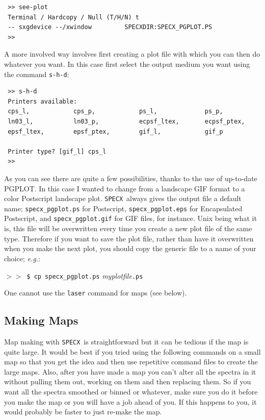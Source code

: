\documentclass[11pt,twoside]{article}
\newcommand{\eg}{{\it e.g.}}
\newcommand{\SPECX}{{\tt SPECX}}
\newcommand{\SP}{{$>\!>$}}
\begin{document}
\begin{verbatim}
 >> see-plot
 Terminal / Hardcopy / Null (T/H/N) t
 -- sxgdevice --/xwindow         SPECXDIR:SPECX_PGPLOT.PS
 >> 
\end{verbatim}

A more involved way involves first creating a plot file with which you
can then do whatever you want. In this case first select the output
medium you want using the command {\tt s-h-d}:

\begin{verbatim}
 >> s-h-d
 Printers available: 
 cps_l,            cps_p,            ps_l,             ps_p,             
 ln03_l,           ln03_p,           ecpsf_ltex,       ecpsf_ptex,       
 epsf_ltex,        epsf_ptex,        gif_l,            gif_p             
 
 Printer type? [gif_l] cps_l
 >> 
\end{verbatim}

As you can see there are quite a few possibilities, thanks to the use
of up-to-date PGPLOT. In this case I wanted to change from a landscape
GIF format to a color Postscript landscape plot. \SPECX\ always gives
the output file a default name; \verb|specx_pgplot.ps| for Postscript,
\verb|specx_pgplot.eps| for Encapsulated Postscript, 
and \verb|specx_pgplot.gif| for GIF files, for instance. Unix being
what it is, this file will be overwritten every time you create a new
plot file of the same type.  Therefore if you want to save the plot
file, rather than have it overwritten when you make the next plot, you
should copy the generic file to a name of your choice; \eg :

\SP\ \verb|$ cp specx_pgplot.ps| {\it myplotfile}{\tt .ps}


One cannot use the {\tt laser} command for maps (see below). 

\subsection{Making Maps}
\label{sec:specx_13}
Map making with \SPECX\ is straightforward but it can be tedious if
the map is quite large.  It would be best if you tried using the
following commands on a small map so that you get the idea and then
use repetitive command files to create the large maps.  Also, after
you have made a map you can't alter all the spectra in it without
pulling them out, working on them and then replacing them.  So if you
want all the spectra smoothed or binned or whatever, make sure you do
it before you make the map or you will have a job ahead of you. If
this happens to you, it would probably be faster to just re-make the
map.
\end{document}
